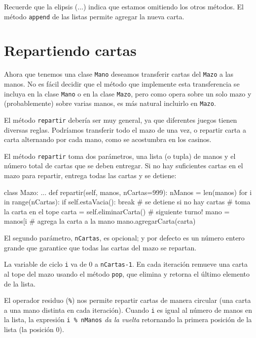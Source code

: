 Recuerde que la elipsis (...) indica que estamos omitiendo los otros
métodos. El método \texttt{append} de las listas permite agregar la
nueva carta.

\section{Repartiendo cartas}


Ahora que tenemos una clase \texttt{Mano} deseamos transferir cartas
del \texttt{Mazo} a las manos. No es fácil decidir que el método que
implemente esta transferencia se incluya en la clase \texttt{Mano}
o en la clase \texttt{Mazo}, pero como opera sobre un solo mazo y
(probablemente) sobre varias manos, es más natural incluirlo en \texttt{Mazo}.

El método \texttt{repartir} debería ser muy general, ya que diferentes
juegos tienen diversas reglas. Podríamos transferir todo el mazo de
una vez, o repartir carta a carta alternando por cada mano, como se
acostumbra en los casinos.

El método \texttt{repartir} toma dos parámetros, una lista (o tupla)
de manos y el número total de cartas que se deben entregar. Si no
hay suficientes cartas en el mazo para repartir, entrega todas las
cartas y se detiene:

\begin{pythoncode}
class Mazo:
  ...
  def repartir(self, manos, nCartas=999):
    nManos = len(manos)
    for i in range(nCartas):
      if self.estaVacia(): 
            break    # se detiene si no hay cartas
      # toma la carta en el tope
      carta = self.eliminarCarta() 
      # siguiente turno!
      mano = manos[i %
      # agrega la carta a la mano
      mano.agregarCarta(carta) 
\end{pythoncode}
 El segundo parámetro, \texttt{nCartas}, es opcional; y por defecto
es un número entero grande que garantice que todas las cartas del
mazo se repartan.

 

La variable de ciclo \texttt{i} va de 0 a \texttt{nCartas-1}. En cada
iteración remueve una carta al tope del mazo usando el método \texttt{pop},
que elimina y retorna el último elemento de la lista.

 

El operador residuo (\texttt{\%}) nos permite repartir cartas de manera
circular (una carta a una mano distinta en cada iteración). Cuando
\texttt{i} es igual al número de manos en la lista, la expresión \texttt{i
\% nManos} \textit{da la vuelta} retornando la primera posición de
la lista (la posición 0).

